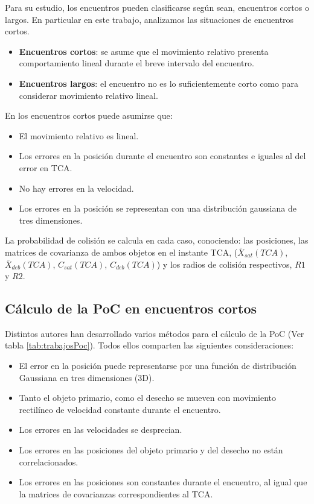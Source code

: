 {Para su estudio, los encuentros pueden clasificarse seg\'un sean, encuentros cortos o largos. En particular en este trabajo, analizamos las situaciones de encuentros cortos.\\

\begin{itemize}
 \item {\bf{Encuentros cortos}}: se asume que el movimiento relativo presenta comportamiento lineal durante el breve intervalo del encuentro.
 \item {\bf{Encuentros largos}}: el encuentro no es lo suficientemente corto como para considerar movimiento relativo lineal.
\end{itemize}


En los encuentros cortos puede asumirse que:\\

\begin{itemize}
\itemsep0em
 \item El movimiento relativo es lineal.
 \item Los errores en la posici\'on durante el encuentro son constantes e iguales al del error en TCA.
 \item No hay errores en la velocidad.
 \item Los errores en la posici\'on se representan con una distribuci\'on gaussiana de tres dimensiones.
\end{itemize}

La probabilidad de colisi\'on se calcula en cada caso, conociendo: las posiciones, las matrices de covarianza de ambos objetos en el instante TCA, ($\bar{X}_{sat}(TCA)$, $\bar{X}_{deb}(TCA)$, $C_{sat}(TCA)$, $C_{deb}(TCA)$) y los radios de colisi\'on respectivos, $R1$ y $R2$.

\subsection*{C\'alculo de la PoC en encuentros cortos}

Distintos autores han desarrollado varios m\'etodos para el c\'alculo de la PoC (Ver tabla \ref{tab:trabajosPoc}). Todos ellos comparten las siguientes consideraciones:\\
\begin{itemize}
\itemsep0em
\item El error en la posici\'on puede representarse por una funci\'on de distribuci\'on Gaussiana en tres dimensiones (3D).
\item Tanto el objeto primario, como el desecho se mueven con movimiento rectil\'ineo de velocidad constante durante el encuentro.
\item Los errores en las velocidades se desprecian.
\item Los errores en las posiciones del objeto primario y del desecho no est\'an correlacionados.
\item Los errores en las posiciones son constantes durante el encuentro, al igual que la matrices de covarianzas correspondientes al TCA.
\end{itemize}

}
